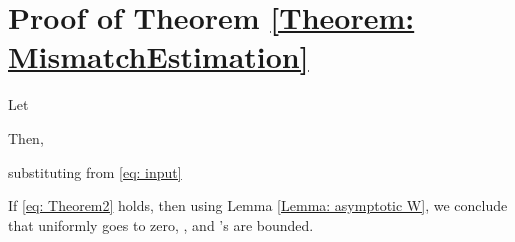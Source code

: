 \documentclass[conference]{IEEEtran}
\begin{document}
\section{Proof of Theorem \ref{Theorem: MismatchEstimation}}\label{Proof: MismatchEstimation}
\begin{IEEEproof}
		Let 
		 
		
		Then,
		
		substituting  from \eqref{eq: input} 
		
		If \eqref{eq: Theorem2} holds, then using Lemma \ref{Lemma: asymptotic W}, we conclude that  uniformly goes to zero, , and 's are bounded.
		\end{IEEEproof}
		


	







\end{document}
